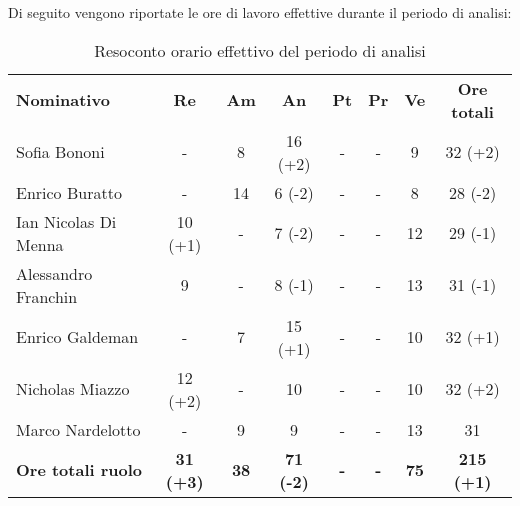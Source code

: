 \documentclass[../piano-di-progetto.tex]{subfiles}
\begin{document}
Di seguito vengono riportate le ore di lavoro effettive durante il periodo di analisi:
\begin{table}[H]
    \centering
    \begin{tabular}{lccccccc}
      \rowcolor{lightgray}
      \textbf{Nominativo}       & \textbf{Re}      & \textbf{Am} & \textbf{An}      & \textbf{Pt} & \textbf{Pr} & \textbf{Ve} & \textbf{Ore totali} \\
      Sofia Bononi              & -                & 8           & 16 (+2)          & -           & -           & 9           & 32 (+2)             \\
      Enrico Buratto            & -                & 14          & 6 (-2)           & -           & -           & 8           & 28 (-2)             \\
      Ian Nicolas Di Menna      & 10 (+1)          & -           & 7 (-2)           & -           & -           & 12          & 29 (-1)             \\
      Alessandro Franchin       & 9                & -           & 8 (-1)           & -           & -           & 13          & 31 (-1)             \\
      Enrico Galdeman           & -                & 7           & 15 (+1)             & -           & -           & 10       & 32 (+1)                  \\
      Nicholas Miazzo           & 12 (+2)          & -           & 10               & -           & -           & 10          & 32 (+2)             \\
      Marco Nardelotto          & -                & 9           & 9                & -           & -           & 13          & 31                  \\
      \textbf{Ore totali ruolo} & \textbf{31 (+3)} & \textbf{38} & \textbf{71 (-2)} & \textbf{-}  & \textbf{-}  & \textbf{75} & \textbf{215 (+1)}       
      
    \end{tabular}
    \caption{Resoconto orario effettivo del periodo di analisi}
  \end{table}
\end{document}
